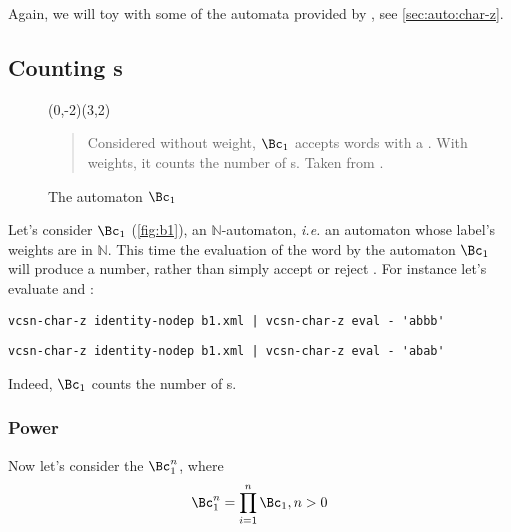 \documentclass[a4paper]{report}
\newenvironment{legend}{%
  \begin{quote}%
    }{%
  \end{quote}%
}
\begin{document}
Again, we will toy with some of the automata provided by
, see \autoref{sec:auto:char-z}.

\subsection{Counting s}

\begin{figure}[tp] \centering
  \begin{VCPicture}{(0,-2)(3,2)}
     
  \end{VCPicture}
  \begin{legend}
    Considered without weight, $\Bc_1$ accepts words with a .
    With weights, it counts the number of s.
    Taken from \citet[Fig. III.2.2, p.  434]{sakarovitch.03.eta}.
  \end{legend}
  \caption{The automaton $\Bc_1$}
  \label{fig:b1}
\end{figure}

Let's consider $\Bc_1$ (\autoref{fig:b1}), an
$\mathbb{N}$-automaton,
\textit{i.e.}  an automaton whose label's weights are in $\mathbb{N}$.
This time the evaluation of the word  by the automaton
$\Bc_1$ will produce a number, rather than simply accept or
reject .  For instance let's evaluate  and
:

\begin{verbatim}
vcsn-char-z identity-nodep b1.xml | vcsn-char-z eval - 'abbb'
\end{verbatim}
\begin{verbatim}
vcsn-char-z identity-nodep b1.xml | vcsn-char-z eval - 'abab'
\end{verbatim}

\noindent
Indeed, $\Bc_1$ counts the number of s.

\subsubsection{Power}

Now let's consider the $\Bc_1^n$, where
\begin{displaymath}
  \Bc_1^n = \prod_{i=1}^n \Bc_1, n > 0
\end{displaymath}
\end{document}
